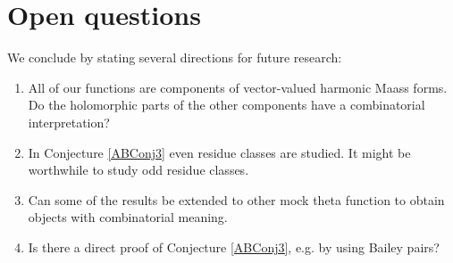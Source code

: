 \documentclass[12pt,reqno]{amsart}
\renewcommand{\(}{\left\(}
\renewcommand{\)}{\right\)}
\numberwithin{equation}{section}
\theoremstyle{plain}
\theoremstyle{definition}
\numberwithin{equation}{section}
\begin{document}
\section{Open questions}\label{sec6}

We conclude by stating several directions for future research:
\begin{enumerate}
	\item All of our functions are components of vector-valued harmonic Maass forms. Do the holomorphic parts of the other components have a combinatorial interpretation?
	\item In Conjecture \ref{ABConj3} even residue classes are studied. It might be worthwhile to study odd residue classes.
	\item Can some of the results be extended to other mock theta function to obtain objects with combinatorial meaning. 
	\item Is there a direct proof of Conjecture \ref{ABConj3}, e.g. by using Bailey pairs?
\end{enumerate}

 




\end{document}
